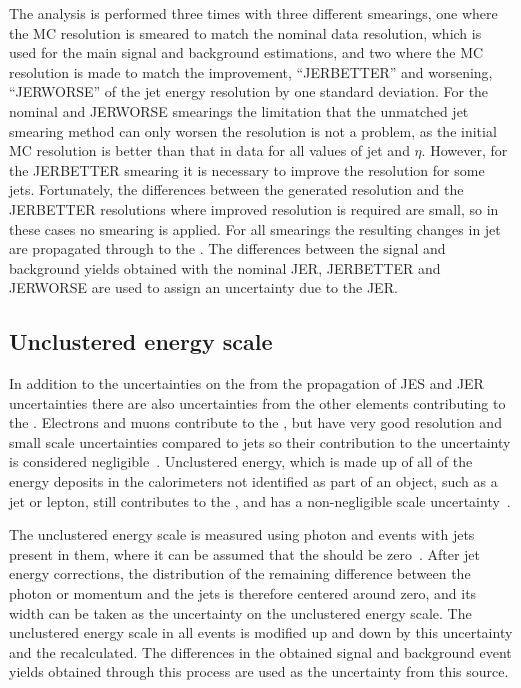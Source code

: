 The analysis is performed three times with three different smearings, one where the MC resolution is smeared to match the nominal data resolution, which is used for the main signal and background estimations, and two where the \ac{MC} resolution is made to match the improvement, ``JERBETTER'' and worsening, ``JERWORSE'' of the jet energy resolution by one standard deviation. For the nominal and JERWORSE smearings the limitation that the unmatched jet smearing method can only worsen the resolution is not a problem, as the initial \ac{MC} resolution is better than that in data for all values of jet \pt and $\eta$. However, for the JERBETTER smearing it is necessary to improve the resolution for some jets. Fortunately, the differences between the generated resolution and the JERBETTER resolutions where improved resolution is required are small, so in these cases no smearing is applied. For all smearings the resulting changes in jet \pt are propagated through to the \MET. The differences between the signal and background yields obtained with the nominal \ac{JER}, JERBETTER and JERWORSE are used to assign an uncertainty due to the \ac{JER}.

\subsection{Unclustered energy scale}
\label{sec:promptues}
In addition to the uncertainties on the \MET from the propagation of \ac{JES} and \ac{JER} uncertainties there are also uncertainties from the other elements contributing to the \MET. Electrons and muons contribute to the \MET, but have very good resolution and small scale uncertainties compared to jets so their contribution to the \MET uncertainty is considered negligible~\cite{CMS-PAS-JME-12-002}. Unclustered energy, which is made up of all of the energy deposits in the calorimeters not identified as part of an object, such as a jet or lepton, still contributes to the \MET, and has a non-negligible scale uncertainty~\cite{CMS-PAS-JME-12-002}. %

The unclustered energy scale is measured using photon and \PZ events with jets present in them, where it can be assumed that the \MET should be zero~\cite{CMS-PAS-JME-12-002}. After jet energy corrections, the distribution of the remaining difference between the photon or \PZ momentum and the jets is therefore centered around zero, and its width can be taken as the uncertainty on the unclustered energy scale. The unclustered energy scale in all events is modified up and down by this uncertainty and the \MET recalculated. The differences in the obtained signal and background event yields obtained through this process are used as the uncertainty from this source.

